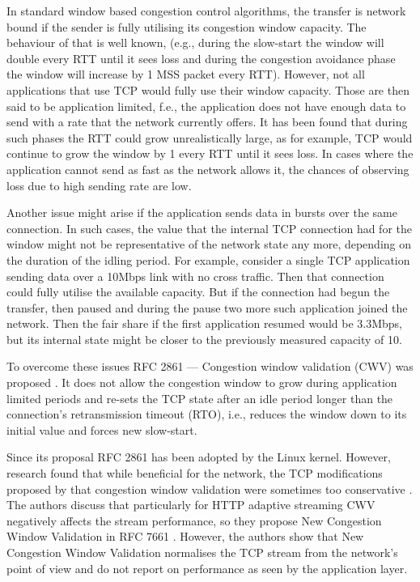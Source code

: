 \documentclass[10pt,sigconf]{acmart}
\begin{document}
In standard window based congestion control algorithms, the transfer is network bound if the sender is fully utilising its congestion window capacity. The behaviour of that is well known, (e.g., during the slow-start the window will double every RTT until it sees loss and during the congestion avoidance phase the window will increase by 1 MSS packet every RTT). However, not all applications that use TCP would fully use their window capacity. Those are then said to be application limited, f.e., the application does not have enough data to send with a rate that the network currently offers. It has been found that during such phases the RTT could grow unrealistically large, as for example, TCP would continue to grow the window by 1 every RTT until it sees loss. In cases where the application cannot send as fast as the network allows it, the chances of observing loss due to high sending rate are low.

Another issue might arise if the application sends data in bursts over the same connection. In such cases, the value that the internal TCP connection had for the window might not be representative of the network state any more, depending on the duration of the idling period. For example, consider a single TCP application sending data over a 10Mbps link with no cross traffic. Then that connection could fully utilise the available capacity. But if the connection had begun the transfer, then paused and during the pause two more such application joined the network. Then the fair share if the first application resumed would be 3.3Mbps, but its internal state might be closer to the previously measured capacity of 10.

To overcome these issues RFC 2861 — Congestion window validation (CWV) was proposed \cite{rfc2861-2000-padhye-congestion-window-validation}. It does not allow the congestion window to grow during application limited periods and re-sets the TCP state after an idle period longer than the connection's retransmission timeout (RTO), i.e., reduces the window down to its initial value and forces new slow-start.

Since its proposal RFC 2861 has been adopted by the Linux kernel. However, research found that while beneficial for the network, the TCP modifications proposed by that congestion window validation were sometimes too conservative \cite{Nazir-2014-performance-evaluation-congestion-window-validation-dash-newcwv}. The authors discuss that particularly for HTTP adaptive streaming CWV negatively affects the stream performance, so they propose New Congestion Window Validation in RFC 7661 \cite{rfc7661-2015-fairhurst-new-cwnd-validation}. However, the authors show that New Congestion Window Validation normalises the TCP stream from the network's point of view and do not report on performance as seen by the application layer.
\end{document}
